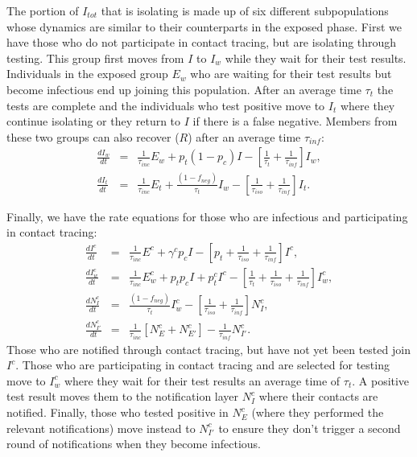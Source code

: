 \documentclass[notitlepage, superscriptaddress]{revtex4-2}
\begin{document}
The portion of $I_{tot}$ that is isolating is made up of six different subpopulations whose dynamics are similar to their counterparts in the exposed phase. First we have those who do not participate in contact tracing, but are isolating through testing. This group first moves from $I$ to $I_{w}$ while they wait for their test results. Individuals in the exposed group $E_{w}$ who are waiting for their test results but become infectious end up joining this population. After an average time $\tau_{t}$ the tests are complete and the individuals who test positive move to $I_{t}$ where they continue isolating or they return to $I$ if there is a false negative. Members from these two groups can also recover ($R$) after an average time $\tau_{inf}$:
\begin{eqnarray}
\label{E:dI_w}
\frac{dI_{w}}{dt} &=& \frac{1}{\tau_{inc}} E_{w} + p_{t} (1 - p_{c}) I - [\frac{1}{\tau_{t}}  + \frac{1}{\tau_{inf}}] I_{w}, \\
%
\frac{dI_{t}}{dt} &=& \frac{1}{\tau_{inc}} E_{t} + \frac{(1- f_{neg})}{\tau_{t}} I_{w} - [\frac{1}{\tau_{iso}}  + \frac{1}{\tau_{inf}}] I_{t}. 
\end{eqnarray}



Finally, we have the rate equations for those who are infectious and participating in contact tracing:
\begin{eqnarray}
\label{E:dIc}
 \frac{dI^{c}}{dt} &=& \frac{1}{\tau_{inc}} E^{c} + \gamma^{c} p_{c} I -[p_{t} +\frac{1}{\tau_{iso}} + \frac{1}{\tau_{inf}}] I^{c}, \\
 \frac{dI^{c}_{w}}{dt} &=& \frac{1}{\tau_{inc}} E^{c}_{w} + p_{t}p_{c} I + p^{c}_{t}I^{c} - [\frac{1}{\tau_{t}}  + \frac{1}{\tau_{iso}}  + \frac{1}{\tau_{inf}}] I^{c}_{w}, \\ 
 \frac{dN^{c}_{I}}{dt} &=&  \frac{(1-f_{neg})}{\tau_{t}} I^{c}_{w} - [\frac{1}{\tau_{iso}}  + \frac{1}{\tau_{inf}}] N^{c}_{I}, \\
 \frac{dN^{c}_{I'}}{dt} &=&  \frac{1}{\tau_{inc}} [N^{c}_{E} + N^{c}_{E'}] - \frac{1}{\tau_{inf}}N^{c}_{I'}.
\end{eqnarray}
Those who are notified through contact tracing, but have not yet been tested join $I^{c}$. Those who are participating in contact tracing and are selected for testing move to $I^{c}_{w}$ where they wait for their test results an average time of $\tau_{t}$. A positive test result moves them to the notification layer $N^{c}_{I}$ where their contacts are notified. Finally, those who tested positive in $N^{c}_{E}$ (where they performed the relevant notifications) move instead to $N^{c}_{I'}$ to ensure they don't trigger a second round of notifications when they become infectious.
\end{document}
